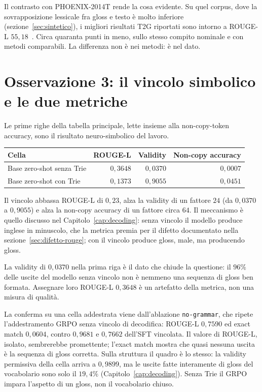 Il contrasto con PHOENIX-2014T rende la cosa evidente. Su quel corpus, dove la
sovrapposizione lessicale fra gloss e testo è molto inferiore
(sezione~\ref{sec:sintetico}), i migliori risultati T2G riportati sono intorno a
ROUGE-L $55{,}18$~\cite{ouargani2023t2g}. Circa quaranta punti in meno, sullo
stesso compito nominale e con metodi comparabili. La differenza non è nei
metodi: è nel dato.

\section{Osservazione 3: il vincolo simbolico e le due metriche}

Le prime righe della tabella principale, lette insieme alla non-copy-token
accuracy, sono il risultato neuro-simbolico del lavoro.

\begin{center}
\begin{tabular}{lrrr}
\toprule
Cella & ROUGE-L & Validity & Non-copy accuracy \\
\midrule
Base zero-shot senza Trie & $0{,}3648$ & $0{,}0370$ & $0{,}0007$ \\
Base zero-shot con Trie & $0{,}1373$ & $0{,}9055$ & $0{,}0451$ \\
\bottomrule
\end{tabular}
\end{center}

Il vincolo abbassa ROUGE-L di $0{,}23$, alza la validity di un fattore $24$
(da $0{,}0370$ a $0{,}9055$) e alza la non-copy accuracy di un fattore circa
$64$. Il meccanismo è quello discusso nel Capitolo~\ref{cap:decoding}: senza
vincolo il modello produce inglese in minuscolo, che la metrica premia per il
difetto documentato nella sezione~\ref{sec:difetto-rouge}; con il vincolo
produce gloss, male, ma producendo gloss.

La validity di $0{,}0370$ nella prima riga è il dato che chiude la questione:
il $96\%$ delle uscite del modello senza vincolo non è nemmeno una sequenza di
gloss ben formata. Assegnare loro ROUGE-L $0{,}3648$ è un artefatto della
metrica, non una misura di qualità.

La conferma su una cella addestrata viene dall'ablazione \texttt{no-grammar},
che ripete l'addestramento GRPO senza vincolo di decodifica: ROUGE-L $0{,}7590$
ed exact match $0{,}0604$, contro $0{,}9681$ e $0{,}7662$ dell'SFT vincolata.
Il valore di ROUGE-L, isolato, sembrerebbe promettente; l'exact match mostra che
quasi nessuna uscita è la sequenza di gloss corretta. Sulla struttura il quadro è
lo stesso: la validity permissiva della cella arriva a $0{,}9899$, ma le uscite
fatte interamente di gloss del vocabolario sono solo il $19{,}4\%$
(Capitolo~\ref{cap:decoding}). Senza Trie il GRPO impara l'aspetto di un gloss,
non il vocabolario chiuso.

